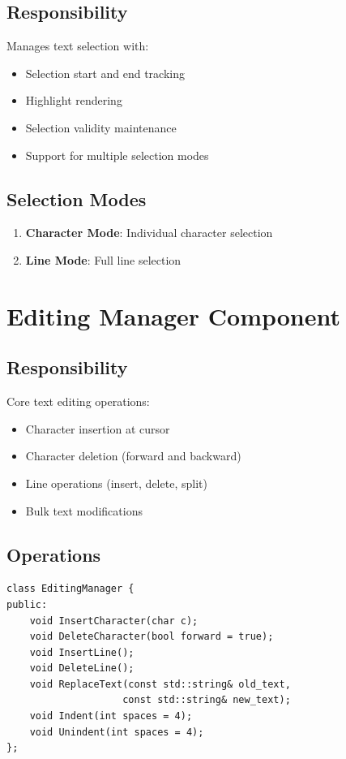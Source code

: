 \documentclass[12pt,a4paper,oneside,openany]{report}
\begin{document}
\subsection{Responsibility}

Manages text selection with:

\begin{itemize}
	\item Selection start and end tracking
	\item Highlight rendering
	\item Selection validity maintenance
	\item Support for multiple selection modes
\end{itemize}

\subsection{Selection Modes}

\begin{enumerate}
	\item \textbf{Character Mode}: Individual character selection
	\item \textbf{Line Mode}: Full line selection
\end{enumerate}

\section{Editing Manager Component}

\subsection{Responsibility}

Core text editing operations:

\begin{itemize}
	\item Character insertion at cursor
	\item Character deletion (forward and backward)
	\item Line operations (insert, delete, split)
	\item Bulk text modifications
\end{itemize}

\subsection{Operations}

\begin{lstlisting}
class EditingManager {
public:
    void InsertCharacter(char c);
    void DeleteCharacter(bool forward = true);
    void InsertLine();
    void DeleteLine();
    void ReplaceText(const std::string& old_text, 
                    const std::string& new_text);
    void Indent(int spaces = 4);
    void Unindent(int spaces = 4);
};
\end{lstlisting}
\end{document}
